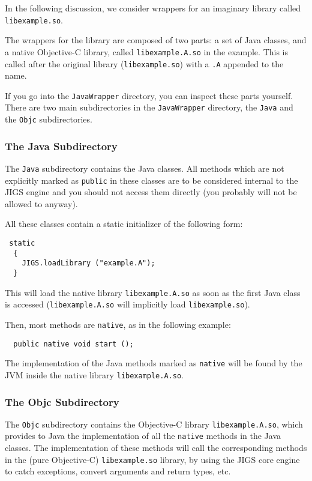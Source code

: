 In the following discussion, we consider wrappers for an imaginary
library called \texttt{libexample.so}.

The wrappers for the library are composed of two parts: a set of Java
classes, and a native Objective-C library, called
\texttt{libexample.A.so} in the example.  This is called after the 
original library (\texttt{libexample.so}) with a \texttt{.A} appended
to the name.

If you go into the \texttt{JavaWrapper} directory, you can inspect
these parts yourself.  There are two main subdirectories in the
\texttt{JavaWrapper} directory, the \texttt{Java} and the
\texttt{Objc} subdirectories.

\subsubsection{The Java Subdirectory}

The \texttt{Java} subdirectory contains the Java classes.  All methods
which are not explicitly marked as \texttt{public} in these classes
are to be considered internal to the JIGS engine and you should not
access them directly (you probably will not be allowed to anyway).

All these classes contain a static initializer of the following form:
\begin{verbatim}
 static
  {
    JIGS.loadLibrary ("example.A");
  }
\end{verbatim}
This will load the native library \texttt{libexample.A.so} as soon as
the first Java class is accessed (\texttt{libexample.A.so} will
implicitly load \texttt{libexample.so}).

Then, most methods are \texttt{native}, as in the following example: 
\begin{verbatim}
  public native void start ();
\end{verbatim}

The implementation of the Java methods marked as \texttt{native} will
be found by the JVM inside the native library \texttt{libexample.A.so}.

\subsubsection{The Objc Subdirectory}

The \texttt{Objc} subdirectory contains the Objective-C library 
\texttt{libexample.A.so}, which provides to Java the implementation 
of all the \texttt{native} methods in the Java classes.  The
implementation of these methods will call the corresponding methods in
the (pure Objective-C) \texttt{libexample.so} library, by using the
JIGS core engine to catch exceptions, convert arguments and return
types, etc.

